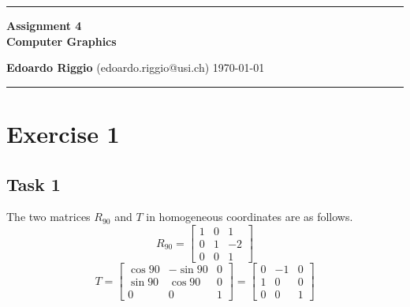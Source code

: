 \documentclass{article}
\begin{document}
\begin{center}
\hrule

\vspace{.4cm}
{\bf {\Huge Assignment 4}} \\
\vspace{.2cm}
{\bf Computer Graphics}
\vspace{.2cm}
\end{center}{\bf Edoardo Riggio } (edoardo.riggio@usi.ch) \hspace{\fill}  \today \\
\hrule
\vspace{.2cm}

\section{Exercise 1}
\subsection{Task 1}
The two matrices $R_{90}$ and $T$ in homogeneous coordinates are as follows.
\[ R_{90} = \begin{bmatrix} 1 & 0 & 1 \\ 0 & 1 & -2 \\ 0 & 0 & 1 \end{bmatrix} \]
\[ T = \begin{bmatrix} \cos{90} & -\sin{90} & 0 \\ \sin{90} & \cos{90} & 0 \\ 0 & 0 & 1 \end{bmatrix} = \begin{bmatrix} 0 & -1 & 0 \\ 1 & 0 & 0 \\ 0 & 0 & 1 \end{bmatrix} \]
\end{document}
